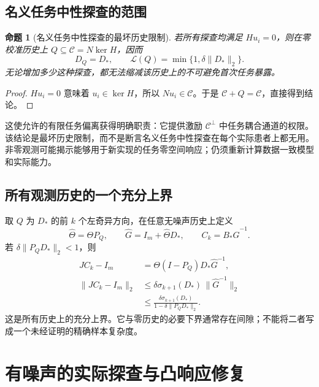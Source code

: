 \documentclass[11pt,a4paper]{article}
\numberwithin{equation}{section}
\newtheorem{proposition}[theorem]{命题}
\theoremstyle{definition}
\begin{document}
\subsection{名义任务中性探查的范围}

\begin{proposition}[名义任务中性探查的最坏历史限制]
\label{prop:cal-neutral}
若所有探查均满足 $Hu_i=0$，则在零校准历史上 $Q\subseteq\mathcal C=N\ker H$，因而
\begin{equation}
  D_Q=D_*,
  \qquad
  \mathcal L(Q)=\min\{1,\delta\|D_*\|_2\}.
  \label{eq:cal-neutral-no-width}
\end{equation}
无论增加多少这种探查，都无法缩减该历史上的不可避免首次任务暴露。
\end{proposition}

\begin{proof}
$Hu_i=0$ 意味着 $u_i\in\ker H$，所以 $Nu_i\in\mathcal C$。于是 $\mathcal C+Q=\mathcal C$，直接得到结论。
\end{proof}

这使允许的有限任务偏离获得明确职责：它提供激励 $\mathcal C^\perp$ 中任务耦合通道的权限。该结论是最坏历史限制，而不是断言名义任务中性探查在每个实际患者上都无用。非零观测可能揭示能够用于新实现的任务零空间响应；仍须重新计算数据一致模型和实际能力。

\subsection{所有观测历史的一个充分上界}

取 $Q$ 为 $D_*$ 的前 $k$ 个左奇异方向，在任意无噪声历史上定义
\begin{equation}
  \widehat\Theta=\Theta P_Q,\qquad
  \widehat G=I_m+\widehat\Theta D_*,
  \qquad C_k=B_*\widehat G^{-1}.
\end{equation}
若 $\delta\|P_QD_*\|_2<1$，则
\begin{align}
  JC_k-I_m
  &=\Theta(I-P_Q)D_*\widehat G^{-1},\\
  \|JC_k-I_m\|_2
  &\le
  \delta\sigma_{k+1}(D_*)\,
  \|\widehat G^{-1}\|_2\\
  &\le
  \frac{\delta\sigma_{k+1}(D_*)}
  {1-\delta\|P_QD_*\|_2}.
  \label{eq:cal-nonzero-upper}
\end{align}
这是所有历史上的充分上界。它与零历史的必要下界通常存在间隙；不能将二者写成一个未经证明的精确样本复杂度。



\section{有噪声的实际探查与凸响应修复}
\label{sec:cal-noisy}
\end{document}
